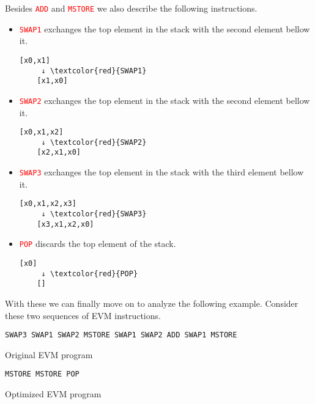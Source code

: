 Besides \textcolor{red}{\texttt{ADD}} and \textcolor{red}{\texttt{MSTORE}} we also
describe the following instructions.
\begin{itemize}
    \item \textcolor{red}{\texttt{SWAP1}} exchanges the top element in the stack with the
    second element bellow it.
    \begin{Verbatim}[commandchars=\\\{\}]
    [x0,x1]
     ↓ \textcolor{red}{SWAP1}
    [x1,x0]
    \end{Verbatim}

    \item \textcolor{red}{\texttt{SWAP2} } exchanges the top element in the stack with the
    second element bellow it.
    \begin{Verbatim}[commandchars=\\\{\}]
    [x0,x1,x2]
     ↓ \textcolor{red}{SWAP2}
    [x2,x1,x0]
    \end{Verbatim}

    \item \textcolor{red}{\texttt{SWAP3}} exchanges the top element in the stack with the
    third element bellow it.
    \begin{Verbatim}[commandchars=\\\{\}]
    [x0,x1,x2,x3]
     ↓ \textcolor{red}{SWAP3}
    [x3,x1,x2,x0]
    \end{Verbatim}

    \item \textcolor{red}{\texttt{POP}} discards the top element of the stack.
    \begin{Verbatim}[commandchars=\\\{\}]
    [x0] 
     ↓ \textcolor{red}{POP}
    []
    \end{Verbatim}
\end{itemize}

With these we can finally move on to analyze the following example. Consider
these two sequences of EVM instructions.

\begin{listing}[!ht]
{\color{red}
\begin{verbatim}
SWAP3 SWAP1 SWAP2 MSTORE SWAP1 SWAP2 ADD SWAP1 MSTORE
\end{verbatim}
}
\caption{Original EVM program}
\label{lst:evm-original}
\end{listing}

\begin{listing}[!ht]
{\color{red}
\begin{verbatim}
MSTORE MSTORE POP 
\end{verbatim}
}
\caption{Optimized EVM program}
\label{lst:evm-optimized}
\end{listing}


